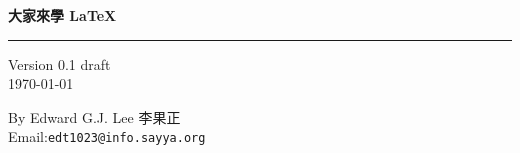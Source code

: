 \documentclass[12pt,a4paper]{report}
\begin{document}
\begin{CJK}{UTF8}{bsmi}
\begin{titlepage} %
\vspace*{5ex}
  \begin{flushright} %
     \Huge\textbf{大家來學 \LaTeX}
  \end{flushright}
\rule{\textwidth}{.256ex}
\begin{flushleft} %
Version 0.1 draft\\
\today
\end{flushleft}
\vspace{8ex}
\vspace{8ex}
\begin{flushright} %
By Edward G.J. Lee 李果正\\
Email:\texttt{edt1023@info.sayya.org}
\end{flushright}
\end{titlepage}
\end{CJK}
\end{document}
